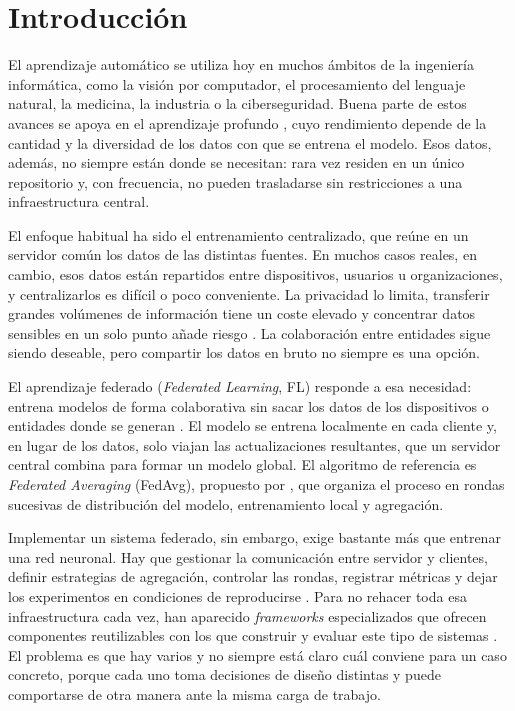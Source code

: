 \chapter{Introducción}\label{chap:introduccion}

El aprendizaje automático se utiliza hoy en muchos ámbitos de la ingeniería
informática, como la visión por computador, el procesamiento del lenguaje natural, la
medicina, la industria o la ciberseguridad. Buena parte de estos avances se apoya en el
aprendizaje profundo \parencite{goodfellow2016deep}, cuyo rendimiento depende de la
cantidad y la diversidad de los datos con que se entrena el modelo. Esos datos, además,
no siempre están donde se necesitan: rara vez residen en un único repositorio y, con
frecuencia, no pueden trasladarse sin restricciones a una infraestructura central.

El enfoque habitual ha sido el entrenamiento centralizado, que reúne en un servidor
común los datos de las distintas fuentes. En muchos casos reales, en cambio, esos datos
están repartidos entre dispositivos, usuarios u organizaciones, y centralizarlos es
difícil o poco conveniente. La privacidad lo limita, transferir grandes volúmenes de
información tiene un coste elevado y concentrar datos sensibles en un solo punto añade
riesgo \parencite{li2020federated,kairouz2021advances}. La colaboración entre entidades
sigue siendo deseable, pero compartir los datos en bruto no siempre es una opción.

El aprendizaje federado (\textit{Federated Learning}, FL) responde a esa necesidad:
entrena modelos de forma colaborativa sin sacar los datos de los dispositivos o
entidades donde se generan \parencite{kairouz2021advances}. El modelo se entrena
localmente en cada cliente y, en lugar de los datos, solo viajan las actualizaciones
resultantes, que un servidor central combina para formar un modelo global. El algoritmo
de referencia es \textit{Federated Averaging} (FedAvg), propuesto por
\textcite{mcmahan2017communication}, que organiza el proceso en rondas sucesivas de
distribución del modelo, entrenamiento local y agregación.

Implementar un sistema federado, sin embargo, exige bastante más que entrenar una red
neuronal. Hay que gestionar la comunicación entre servidor y clientes, definir
estrategias de agregación, controlar las rondas, registrar métricas y dejar los
experimentos en condiciones de reproducirse \parencite{bonawitz2019towards}. Para no
rehacer toda esa infraestructura cada vez, han aparecido \textit{frameworks}
especializados que ofrecen componentes reutilizables con los que construir y evaluar
este tipo de sistemas \parencite{bonawitz2019towards,caldas2018leaf}. El problema es que
hay varios y no siempre está claro cuál conviene para un caso concreto, porque cada uno
toma decisiones de diseño distintas y puede comportarse de otra manera ante la misma
carga de trabajo.

